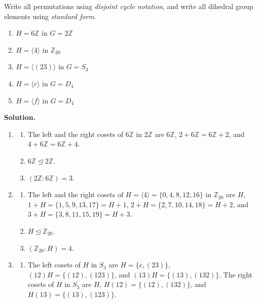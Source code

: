 \documentclass[10pt,]{book}
\theoremstyle{plain}
\theoremstyle{definition}
\theoremstyle{definition}
\theoremstyle{definition}
\theoremstyle{definition}
\numberwithin{equation}{section}
\def\Z{\mathbb{Z}}
\begin{document}
\begin{exerciselist}
\par
Write all permutations using \emph{disjoint cycle notation}, and write all dihedral group elements using \emph{standard form}.%
\leavevmode%
\begin{enumerate}[label=(\alph*)]
\item\hypertarget{li-423}{}\(H=6\Z\) in \(G=2\Z\)%
\item\hypertarget{li-424}{}\(H=\langle 4\rangle\) in \(\Z_{20}\)%
\item\hypertarget{li-425}{}\(H=\langle (23)\rangle\) in \(G=S_3\)%
\item\hypertarget{li-426}{}\(H=\langle r\rangle\) in \(G=D_4\)%
\item\hypertarget{li-427}{}\(H=\langle f\rangle\) in \(G=D_4\)%
\end{enumerate}
\par\smallskip
\par\smallskip
\noindent\textbf{Solution.}\hypertarget{solution-53}{}\quad
\leavevmode%
\begin{enumerate}[label=(\alph*)]
\item\hypertarget{li-428}{}%
\begin{enumerate}[label=\roman*.]
\item\hypertarget{li-429}{}The left and the right cosets of \(6\Z\) in \(2\Z\) are \(6\Z\), \(2+6\Z=6\Z+2\), and \(4+6\Z=6\Z+4\).%
\item\hypertarget{li-430}{}\(6\Z \unlhd 2\Z\).%
\item\hypertarget{li-431}{}\((2\Z:6\Z)=3\).%
\end{enumerate}
%
\item\hypertarget{li-432}{}%
\begin{enumerate}[label=\roman*.]
\item\hypertarget{li-433}{}The left and the right cosets of \(H=\langle 4\rangle =\{0,4,8,12,16\}\) in \(\Z_{20}\) are \(H\), \(1+H=\{1,5,9,13,17\}=H+1\), \(2+H=\{2,7,10,14,18\}=H+2\), and \(3+H=\{3,8,11,15,19\}=H+3\).%
\item\hypertarget{li-434}{}\(H \unlhd \Z_{20}\).%
\item\hypertarget{li-435}{}\((\Z_{20}:H)=4\).%
\end{enumerate}
%
\item\hypertarget{li-436}{}%
\begin{enumerate}[label=\roman*.]
\item\hypertarget{li-437}{}The left cosets of \(H\) in \(S_3\) are \(H=\{e,(23)\}\), \((12)H=\{(12),(123)\}\), and \((13)H=\{(13),(132)\}\). The right cosets of \(H\) in \(S_3\) are \(H\), \(H(12)=\{(12),(132)\}\), and \(H(13)=\{(13),(123)\}\).%

\end{enumerate}
\end{enumerate}
\end{exerciselist}
\end{document}
